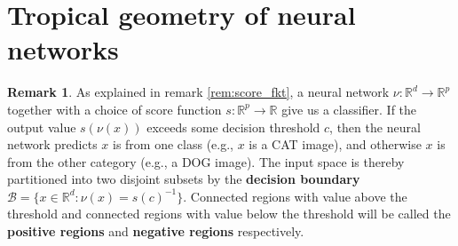 \documentclass{article}
\theoremstyle{definition}
\newtheorem{remark}[theorem]{Remark}
\begin{document}
\newpage

\section{Tropical geometry of neural networks}
\label{sec:tropical_geometry_of_neural_networks}

\begin{remark}\cite{zhang2018tropical}
As explained in remark \ref{rem:score_fkt}, a neural network $\nu : \mathbb{R}^{d} \to \mathbb{R}^{p}$ together with a choice of score function $s : \mathbb{R}^{p} \to \mathbb{R}$ give us a classifier. If the output value $s(\nu(x))$ exceeds some
decision threshold $c$, then the neural network predicts $x$ is
from one class (e.g., $x$ is a CAT image), and otherwise $x$
is from the other category (e.g., a DOG image). The input
space is thereby partitioned into two disjoint subsets by the
\textbf{decision boundary} $\mathcal{B} = \{ x \in \mathbb{R}^{d}: \nu(x)=s(c)^{-1} \}$. Connected regions with value above the threshold and connected
regions with value below the threshold will be called the
\textbf{positive regions} and \textbf{negative regions} respectively.
\end{remark}
\end{document}
